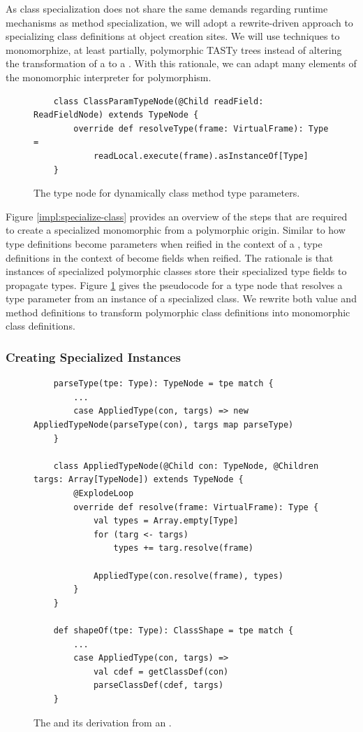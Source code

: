 As class specialization does not share the same demands regarding runtime mechanisms as method specialization, we will adopt a rewrite-driven approach to specializing class definitions at object creation sites.
We will use techniques to monomorphize, at least partially, polymorphic TASTy trees instead of altering the transformation of a  to a .
With this rationale, we can adapt many elements of the monomorphic interpreter for polymorphism.

\begin{figure}[!htb]
	\begin{verbatim}
	class ClassParamTypeNode(@Child readField: ReadFieldNode) extends TypeNode {
		override def resolveType(frame: VirtualFrame): Type = 
			readLocal.execute(frame).asInstanceOf[Type]
	}
	\end{verbatim}
	\caption{The type node for dynamically class method type parameters.}
	\label{impl:class-param-typenode}
\end{figure}

Figure \ref{impl:specialize-class} provides an overview of the steps that are required to create a specialized monomorphic  from a polymorphic origin.
Similar to how type definitions become parameters when reified in the context of a , type definitions in the context of  become fields when reified.
The rationale is that instances of specialized polymorphic classes store their specialized type fields to propagate types.
Figure \ref{impl:class-param-typenode} gives the pseudocode for a type node that resolves a type parameter from an instance of a specialized class.
We rewrite both value and method definitions to transform polymorphic class definitions into monomorphic class definitions.

\subsubsection*{Creating Specialized Instances}

\begin{figure}[!htb]
	\begin{verbatim}
	parseType(tpe: Type): TypeNode = tpe match {
		...
		case AppliedType(con, targs) => new AppliedTypeNode(parseType(con), targs map parseType) 
	}

	class AppliedTypeNode(@Child con: TypeNode, @Children targs: Array[TypeNode]) extends TypeNode {
		@ExplodeLoop
		override def resolve(frame: VirtualFrame): Type {
			val types = Array.empty[Type]
			for (targ <- targs)
				types += targ.resolve(frame)
			
			AppliedType(con.resolve(frame), types)
		}
	}

	def shapeOf(tpe: Type): ClassShape = tpe match {
		...
		case AppliedType(con, targs) => 
			val cdef = getClassDef(con)
			parseClassDef(cdef, targs)
	}
	\end{verbatim}
	\caption{The  and its derivation from an .}
	\label{impl:applied-type-node}
\end{figure}

